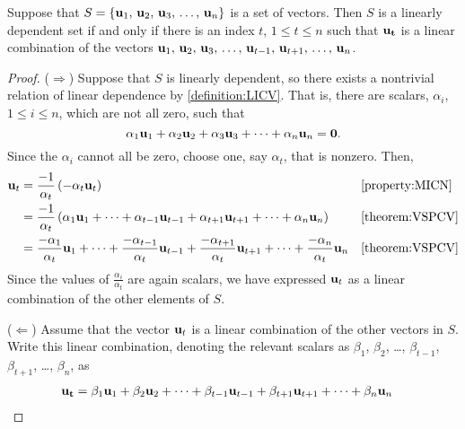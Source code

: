 \documentclass{ximera}
\begin{document}
\begin{theorem}
  \label{theorem:DLDS} Suppose that $S=\left\{\mathbf{u}_{1},\,\mathbf{u}_{2},\,\mathbf{u}_{3},\,\ldots,\,\mathbf{u}_{n}\right\}$ is a
  set of vectors.  Then $S$ is a linearly dependent set if and only if
  there is an index $t$, $1\leq t\leq n$ such that $\mathbf{u_t}$ is a
  linear combination of the vectors
  $\mathbf{u}_1,\,\mathbf{u}_2,\,\mathbf{u}_3,\,\ldots,\,\mathbf{u}_{t-1},\,\mathbf{u}_{t+1},\,\ldots,\,\mathbf{u}_n$.

  \begin{proof}
    ($\Rightarrow$) Suppose that $S$ is linearly dependent, so there
    exists a nontrivial relation of linear dependence by
    \ref{definition:LICV}.  That is, there are scalars, $\alpha_i$,
    $1\leq i\leq n$, which are not all zero, such that
    \[
      \alpha_{1}\mathbf{u}_{1}+\alpha_{2}\mathbf{u}_{2}+\alpha_{3}\mathbf{u}_{3}+\cdots +\alpha_{n}\mathbf{u}_{n}=\mathbf{0}.
    \]
    Since the $\alpha_i$ cannot all be zero, choose one, say $\alpha_t$, that is nonzero.  Then,
    \begin{align*}
      \mathbf{u}_t
      &=\frac{-1}{\alpha_t}\left(-\alpha_t\mathbf{u}_t\right)&&\ref{property:MICN}\\
      &=
        \frac{-1}{\alpha_t}\left(
        \alpha_1\mathbf{u}_1+
        \cdots+
        \alpha_{t-1}\mathbf{u}_{t-1}+
        \alpha_{t+1}\mathbf{u}_{t+1}+
        \cdots+
        \alpha_n\mathbf{u}_n
        \right)&&\ref{theorem:VSPCV}\\
      &=
        \frac{-\alpha_1}{\alpha_t}\mathbf{u}_1+
        \cdots+
        \frac{-\alpha_{t-1}}{\alpha_t}\mathbf{u}_{t-1}+
        \frac{-\alpha_{t+1}}{\alpha_t}\mathbf{u}_{t+1}+
        \cdots+
        \frac{-\alpha_n}{\alpha_t}\mathbf{u}_n
                                                           &&\ref{theorem:VSPCV}
    \end{align*}
    Since the values of $\frac{\alpha_i}{\alpha_t}$ are again scalars,
    we have expressed $\mathbf{u}_t$ as a linear combination of the
    other elements of $S$.
    
    ($\Leftarrow$) Assume that the vector $\mathbf{u}_t$ is a linear
    combination of the other vectors in $S$.  Write this linear
    combination, denoting the relevant scalars as $\beta_1$, $\beta_2$,
    \ldots , $\beta_{t-1}$, $\beta_{t+1}$, \ldots , $\beta_n$, as
    \begin{align*}
      \mathbf{u_t}
      &=
        \beta_1\mathbf{u}_1+
        \beta_2\mathbf{u}_2+
        \cdots+
        \beta_{t-1}\mathbf{u}_{t-1}+
        \beta_{t+1}\mathbf{u}_{t+1}+
        \cdots+
        \beta_n\mathbf{u}_n
    \end{align*}
    

\end{proof}
\end{theorem}
\end{document}
